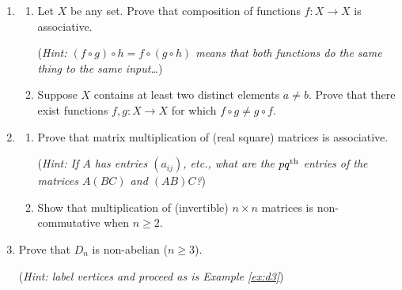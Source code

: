 \begin{exercises}
\begin{enumerate}
		\item\label{exs:funcassoc}
		\begin{enumerate}
		  \item Let $X$ be any set. Prove that composition of functions $f:X\to X$ is associative.\par
			(\emph{Hint: $(f\circ g)\circ h=f\circ(g\circ h)$ means that both functions do the same thing to the same input\ldots})
			\item Suppose $X$ contains at least two distinct elements $a\neq b$. Prove that there exist functions $f,g:X\to X$ for which $f\circ g\neq g\circ f$.
		\end{enumerate}

	  
	  \item\label{exs:matrixassoc}\begin{enumerate}
			\item Prove that matrix multiplication of (real square) matrices is associative.\par
		(\emph{Hint: If $A$ has entries $(a_{ij})$, etc., what are the $pq\textsuperscript{th}$ entries of the matrices $A(BC)$ and $(AB)C$?})
			\item Show that multiplication of (invertible) $n\times n$ matrices is non-commutative when $n\ge 2$.
		\end{enumerate}


		\item Prove that $D_n$ is non-abelian ($n\ge 3$).\par
		(\emph{Hint: label vertices and proceed as is Example \ref{ex:d3}})
	
	  


\end{enumerate}
\end{exercises}
